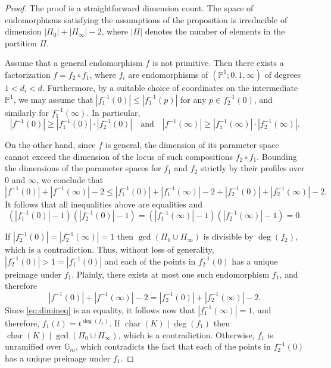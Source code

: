 \documentclass[10pt,a4paper]{amsart}
\newcommand{\GG}{{\mathbb G}}
\newcommand{\PP}{{\mathbb P}}
\DeclareMathOperator{\chara}{char}
\begin{document}
\begin{proof}
    The proof is a straightforward dimension count. The space of endomorphisms satisfying the assumptions of the proposition is irreducible of dimension $|\Pi_0|+|\Pi_\infty|-2$, where $|\Pi|$ denotes the number of elements in the partition $\Pi$. 
    
    Assume that a general endomorphism $f$ is not primitive. Then there exists a factorization $f=f_2\circ f_1$, where $f_i$ are endomorphisms of $(\PP^1;0,1,\infty)$ of degrees $1<d_i<d$. Furthermore, by a suitable choice of coordinates on the intermediate $\PP^1$, we may assume that $|f_1^{-1}(0)|\le |f_1^{-1}(p)|$ for any $p\in f_2^{-1}(0)$, and similarly for $f_1^{-1}(\infty)$. In particular, 
    $$|f^{-1}(0)|\ge |f_1^{-1}(0)|\cdot |f_2^{-1}(0)|\quad \text{and}\quad |f^{-1}(\infty)|\ge |f_1^{-1}(\infty)|\cdot |f_2^{-1}(\infty)|.$$ 
    
    On the other hand, since $f$ is general, the dimension of its parameter space cannot exceed the dimension of the locus of such compositions $f_2 \circ f_1$. Bounding the dimensions of the parameter spaces for $f_1$ and $f_2$ strictly by their profiles over $0$ and $\infty$, we conclude that 
    \begin{equation}\label{eq:dimineq}
        |f^{-1}(0)|+|f^{-1}(\infty)|-2\le |f_1^{-1}(0)|+|f_1^{-1}(\infty)|-2 +|f_2^{-1}(0)|+|f_2^{-1}(\infty)|-2.
    \end{equation}
    It follows that all inequalities above are equalities and
    $$(|f_1^{-1}(0)|-1)(|f_2^{-1}(0)|-1)=(|f_1^{-1}(\infty)|-1)(|f_2^{-1}(\infty)|-1)=0.$$

    If $|f_2^{-1}(0)|=|f_2^{-1}(\infty)|=1$ then $\gcd(\Pi_0\cup \Pi_\infty)$ is divisible by $\deg(f_2)$, which is a contradiction. Thus, without loss of generality, $|f_2^{-1}(0)|>1=|f_1^{-1}(0)|$ and each of the points in $f_2^{-1}(0)$ has a unique preimage under $f_1$. Plainly, there exists at most one such endomorphism $f_1$, and therefore
    $$|f^{-1}(0)|+|f^{-1}(\infty)|-2=|f_2^{-1}(0)|+|f_2^{-1}(\infty)|-2.$$
    Since \eqref{eq:dimineq} is an equality, it follows now that $|f_1^{-1}(\infty)|=1$, and therefore, $f_1(t)=t^{\deg(f_1)}$. If $\chara(K)\mid\deg(f_1)$ then $\chara(K)\mid\gcd(\Pi_0\cup \Pi_\infty)$, which is a contradiction. Otherwise, $f_1$ is unramified over $\GG_m$, which contradicts the fact that each of the points in $f_2^{-1}(0)$ has a unique preimage under $f_1$.
\end{proof}
\end{document}
